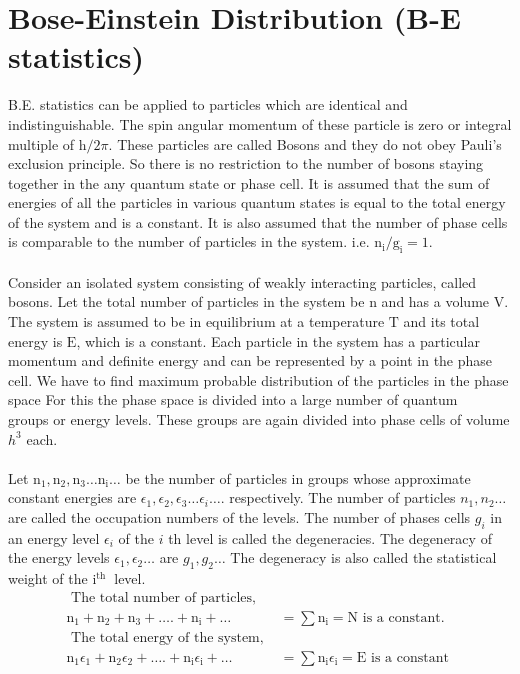 \section{ Bose-Einstein Distribution (B-E statistics)}
 B.E. statistics can be applied to particles which are identical and indistinguishable. The spin angular momentum of these particle is zero or integral multiple of $\mathrm{h} / 2 \pi$. These particles are called Bosons and they do not obey Pauli's exclusion principle. So there is no restriction to the number of bosons staying together in the any quantum state or phase cell. It is assumed that the sum of energies of all the particles in various quantum states is equal to the total energy of the system and is a constant. It is also assumed that the number of phase cells is comparable to the number of particles in the system. i.e. $\mathrm{n}_{\mathrm{i}} / \mathrm{g}_{\mathrm{i}}=1$.\\\\
 Consider an isolated system consisting of weakly interacting particles, called bosons. Let the total number of particles in the system be $\mathrm{n}$ and has a volume $\mathrm{V}$. The system is assumed to be in equilibrium at a temperature $\mathrm{T}$ and its total energy is $\mathrm{E}$, which is a constant. Each particle in the system has a particular momentum and definite energy and can be represented by a point in the phase cell. We have to find maximum probable distribution of the particles in the phase space For this the phase space is divided into a large number of quantum\\
 groups or energy levels. These groups are again divided into phase cells of volume $h^{3}$ each.\\\\
 Let $\mathrm{n}_{1}, \mathrm{n}_{2}, \mathrm{n}_{3} \ldots \mathrm{n}_{\mathrm{i}} \ldots$ be the number of particles in groups whose approximate constant energies are $\epsilon_{1}, \epsilon_{2}, \epsilon_{3} \ldots \epsilon_{i} \ldots .$ respectively. The number of particles $n_{1}, n_{2} \ldots$ are called the occupation numbers of the levels. The number of phases cells $g_{i}$ in an energy level $\epsilon_{i}$ of the $i$ th level is called the degeneracies. The degeneracy of the energy levels $\epsilon_{1}, \epsilon_{2} \ldots$ are $g_{1}, g_{2} \ldots$ The degeneracy is also called the statistical weight of the $\mathrm{i}^{\text {th }}$ level.
 \begin{align*}
 \text { The total number of particles, }\\
 \mathrm{n}_{1}+\mathrm{n}_{2}+\mathrm{n}_{3}+\ldots .+\mathrm{n}_{\mathrm{i}}+\ldots&=\sum \mathrm{n}_{\mathrm{i}}=\mathrm{N} \text { is a constant. }\\
 \text { The total energy of the system, }\\
 \mathrm{n}_{1} \epsilon_{1}+\mathrm{n}_{2} \epsilon_{2}+\ldots .+\mathrm{n}_{\mathrm{i}} \epsilon_{\mathrm{i}}+\ldots&=\sum \mathrm{n}_{\mathrm{i}} \epsilon_{\mathrm{i}}=\mathrm{E} \text { is a constant }
 \end{align*}
